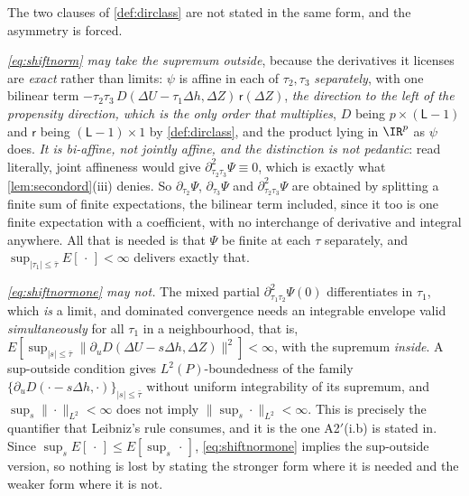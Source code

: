\begin{remark}\label{rem:supinside}
The two clauses of \cref{def:dirclass} are not stated in the same form, and the asymmetry is
forced.

\emph{\eqref{eq:shiftnorm} may take the supremum outside}, because the derivatives it licenses are
\emph{exact} rather than limits: $\psi$ is affine in each of $\tau_2,\tau_3$ \emph{separately}, with one
bilinear term $-\tau_2\tau_3\,D(\Delta U-\tau_1\Delta h,\Delta Z)\,\mathsf r(\Delta Z)$, \emph{the
direction to the left of the propensity direction, which is the only order that multiplies}, $D$ being
$p\times(\mathsf L-1)$ and $\mathsf r$ being $(\mathsf L-1)\times1$ by \cref{def:dirclass}, and the
product lying in $\IR^{p}$ as $\psi$ does. \emph{It is
bi-affine, not jointly affine, and the distinction is not pedantic}: read literally, joint affineness
would give $\partial^{2}_{\tau_2\tau_3}\Psi\equiv0$, which is exactly what \cref{lem:secondord}(iii)
denies. So $\partial_{\tau_2}\Psi$, $\partial_{\tau_3}\Psi$ and $\partial^{2}_{\tau_2\tau_3}\Psi$ are
obtained by splitting a finite sum of finite expectations, the bilinear term included, since it too is
one finite expectation with a coefficient, with no interchange of derivative and integral anywhere.
All that is needed is that $\Psi$ be finite at each $\tau$ separately, and
$\sup_{|\tau_1|\le\bar\tau}E[\,\cdot\,]<\infty$ delivers exactly that.

\emph{\eqref{eq:shiftnormone} may not.} The mixed partial $\partial^{2}_{\tau_1\tau_2}\Psi(0)$
differentiates in $\tau_1$, which \emph{is} a limit, and dominated convergence needs an integrable
envelope valid \emph{simultaneously} for all $\tau_1$ in a neighbourhood, that is,
$E[\sup_{|s|\le\bar\tau}\|\partial_uD(\Delta U-s\Delta h,\Delta Z)\|^{2}]<\infty$, with the supremum
\emph{inside}. A sup-outside condition gives $L^{2}(P)$-boundedness of the family
$\{\partial_uD(\cdot-s\Delta h,\cdot)\}_{|s|\le\bar\tau}$ without uniform integrability of its supremum,
and $\sup_s\|\cdot\|_{L^{2}}<\infty$ does not imply $\|\sup_s\cdot\|_{L^{2}}<\infty$. This is
precisely the quantifier that Leibniz's rule consumes, and it is the one A2$'$(i.b) is stated in. Since
$\sup_sE[\,\cdot\,]\le E[\sup_s\,\cdot\,]$, \eqref{eq:shiftnormone} implies the sup-outside version, so
nothing is lost by stating the stronger form where it is needed and the weaker form where it is not.


\end{remark}
